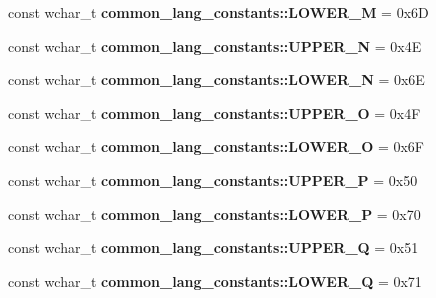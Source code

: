 \begin{DoxyCompactItemize}
\item 
\hypertarget{group___indexing_ga1ed2bd03a10b197eccf9b634c6350475}{const wchar\-\_\-t {\bfseries common\-\_\-lang\-\_\-constants\-::\-L\-O\-W\-E\-R\-\_\-\-M} = 0x6\-D}\label{group___indexing_ga1ed2bd03a10b197eccf9b634c6350475}

\item 
\hypertarget{group___indexing_ga61fa8e6efe7769c52e01bccfe112e888}{const wchar\-\_\-t {\bfseries common\-\_\-lang\-\_\-constants\-::\-U\-P\-P\-E\-R\-\_\-\-N} = 0x4\-E}\label{group___indexing_ga61fa8e6efe7769c52e01bccfe112e888}

\item 
\hypertarget{group___indexing_ga00bb06232b21f53aa54e91d646853b6a}{const wchar\-\_\-t {\bfseries common\-\_\-lang\-\_\-constants\-::\-L\-O\-W\-E\-R\-\_\-\-N} = 0x6\-E}\label{group___indexing_ga00bb06232b21f53aa54e91d646853b6a}

\item 
\hypertarget{group___indexing_gad1958ba2cb8862ab41b0351a8b44d50f}{const wchar\-\_\-t {\bfseries common\-\_\-lang\-\_\-constants\-::\-U\-P\-P\-E\-R\-\_\-\-O} = 0x4\-F}\label{group___indexing_gad1958ba2cb8862ab41b0351a8b44d50f}

\item 
\hypertarget{group___indexing_gaec943fee038d5b2c0cbc1fd76bdb43e3}{const wchar\-\_\-t {\bfseries common\-\_\-lang\-\_\-constants\-::\-L\-O\-W\-E\-R\-\_\-\-O} = 0x6\-F}\label{group___indexing_gaec943fee038d5b2c0cbc1fd76bdb43e3}

\item 
\hypertarget{group___indexing_ga96f411002f9dc4b57e7075082c4661c8}{const wchar\-\_\-t {\bfseries common\-\_\-lang\-\_\-constants\-::\-U\-P\-P\-E\-R\-\_\-\-P} = 0x50}\label{group___indexing_ga96f411002f9dc4b57e7075082c4661c8}

\item 
\hypertarget{group___indexing_ga72da65c5b2ef484732c1689b52ff1d73}{const wchar\-\_\-t {\bfseries common\-\_\-lang\-\_\-constants\-::\-L\-O\-W\-E\-R\-\_\-\-P} = 0x70}\label{group___indexing_ga72da65c5b2ef484732c1689b52ff1d73}

\item 
\hypertarget{group___indexing_ga2e0ee60d83c00126e404ded10c51d296}{const wchar\-\_\-t {\bfseries common\-\_\-lang\-\_\-constants\-::\-U\-P\-P\-E\-R\-\_\-\-Q} = 0x51}\label{group___indexing_ga2e0ee60d83c00126e404ded10c51d296}

\item 
\hypertarget{group___indexing_gab9133148d0b2ca4f09b4e791c6041b59}{const wchar\-\_\-t {\bfseries common\-\_\-lang\-\_\-constants\-::\-L\-O\-W\-E\-R\-\_\-\-Q} = 0x71}\label{group___indexing_gab9133148d0b2ca4f09b4e791c6041b59}


\end{DoxyCompactItemize}
